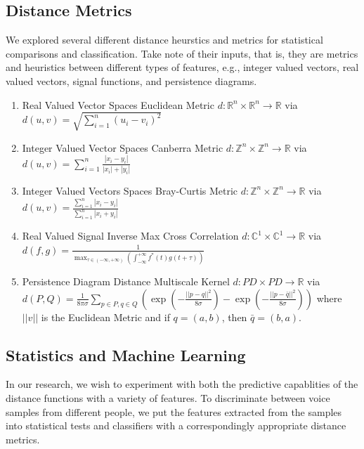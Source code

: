 \documentclass[12pt]{article}
\begin{document}
\subsection{Distance Metrics}
\-\hspace{1cm} We explored several different distance heurstics and metrics for
statistical comparisons and classification. Take note of their inputs, that is,
they are metrics and heuristics between different types of features, e.g.,
integer valued vectors, real valued vectors, signal functions, and persistence
diagrams.
\begin{enumerate}
  \item Real Valued Vector Spaces Euclidean Metric \newline $d : \mathbb{R}^n
  \times \mathbb{R}^n \rightarrow \mathbb{R}$ via $d(u,v) = \sqrt{\sum_{i=1}^{n}(u_i - v_i)^2}$
  \item Integer Valued Vector Spaces Canberra Metric \newline $d : \mathbb{Z}^n
  \times \mathbb{Z}^n \rightarrow \mathbb{R}$ via $d(u,v) = \sum_{i = 1}^{n} \frac{|x_i -
  y_i|}{|x_i| + |y_i|}$
  \item Integer Valued Vectors Spaces Bray-Curtis Metric \newline $d :
  \mathbb{Z}^n \times \mathbb{Z}^n \rightarrow \mathbb{R}$ via $d(u,v) = \frac{\sum_{i = 1}^{n}|x_i
  - y_i|}{\sum_{i = 1}^{n}|x_i + y_i|}$
  \item Real Valued Signal Inverse Max Cross Correlation \newline $d :
  \mathbb{C}^1 \times \mathbb{C}^1 \rightarrow \mathbb{R}$ via $d(f,g) =
  \frac{1}{\max _{\tau \in (-\infty,+\infty)} (\int _{-\infty}^{+\infty}
  f^{*}(t)g(t+\tau))}$
  \item Persistence Diagram Distance Multiscale Kernel \newline $d : PD \times
  PD \rightarrow \mathbb{R}$ via $d(P,Q) = \frac{1}{8 \pi \sigma} \sum_{p \in
  P, q \in Q}(\exp(-\frac{||p-q||^2}{8 \sigma}) -
  \exp(-\frac{||p-\bar{q}||^2}{8 \sigma}))$ where $||v||$ is the Euclidean
  Metric and if $q = (a,b)$, then $\bar{q} = (b,a)$. 
\end{enumerate}

\subsection{Statistics and Machine Learning}
\-\hspace{1cm} In our research, we wish to experiment with both the predictive
capablities of the distance functions with a variety of features. To
discriminate between voice samples from different people, we put the features
extracted from the samples into statistical tests and  classifiers with a
correspondingly appropriate distance metrics.
\end{document}

